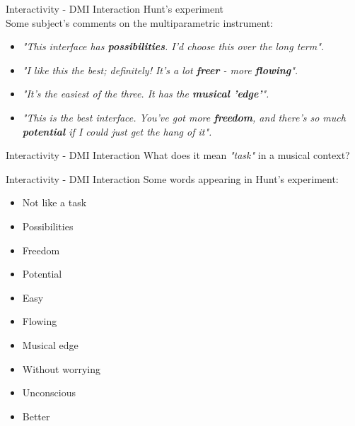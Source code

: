 \documentclass{beamer}
\begin{document}
\begin{frame}{Interactivity - DMI Interaction} 
    Hunt's experiment\\
    \vspace{5mm}
    Some subject's comments on the multiparametric instrument:
    \begin{itemize}
        \item \textit{"This interface has \textbf{possibilities}. I'd choose this over the long term".}
        \item \textit{"I like this the best; definitely! It's a lot \textbf{freer} - more \textbf{flowing}".}
        \item \textit{"It's the easiest of the three. It has the \textbf{musical 'edge'}".}
        \item \textit{"This is the best interface. You've got more \textbf{freedom}, and there's so much \textbf{potential} if I could just get the hang of it".}
    \end{itemize}
\end{frame}



\begin{frame}{Interactivity - DMI Interaction} 
    \Large
    What does it mean \textit{"task"} in a musical context?
\end{frame}

\begin{frame}{Interactivity - DMI Interaction} 
    Some words appearing in Hunt's experiment:
    \begin{itemize}
        \item Not like a task
        \item Possibilities
        \item Freedom
        \item Potential
        \item Easy
        \item Flowing
        \item Musical edge
        \item Without worrying
        \item Unconscious
        \item Better
    \end{itemize}
\end{frame}
\end{document}
